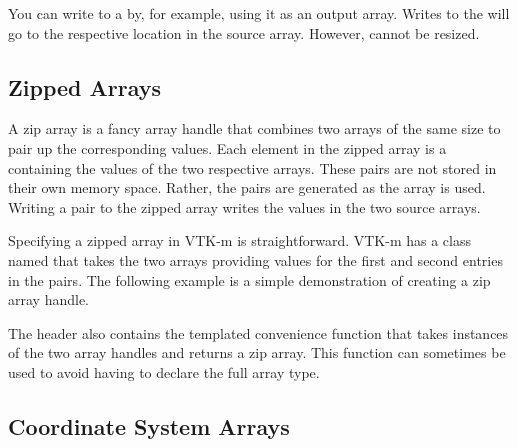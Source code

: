 \begin{didyouknow}
  You can write to a  by, for
  example, using it as an output array. Writes to the
   will go to the respective
  location in the source array. However,
   cannot be resized.
\end{didyouknow}


\subsection{Zipped Arrays}
\label{sec:ZippedArrays}


A zip array is a fancy array handle that combines two arrays of the same
size to pair up the corresponding values. Each element in the zipped array
is a  containing the values of the two respective arrays. These
pairs are not stored in their own memory space. Rather, the pairs are
generated as the array is used. Writing a pair to the zipped array writes
the values in the two source arrays.

Specifying a zipped array in VTK-m is straightforward. VTK-m has a class
named  that takes the two arrays providing values
for the first and second entries in the pairs. The following example is a
simple demonstration of creating a zip array handle.


The  header also contains the
templated convenience function  that takes
instances of the two array handles and returns a zip array. This function
can sometimes be used to avoid having to declare the full array type.



\subsection{Coordinate System Arrays}
\label{sec:CoordinateSystemArrays}

